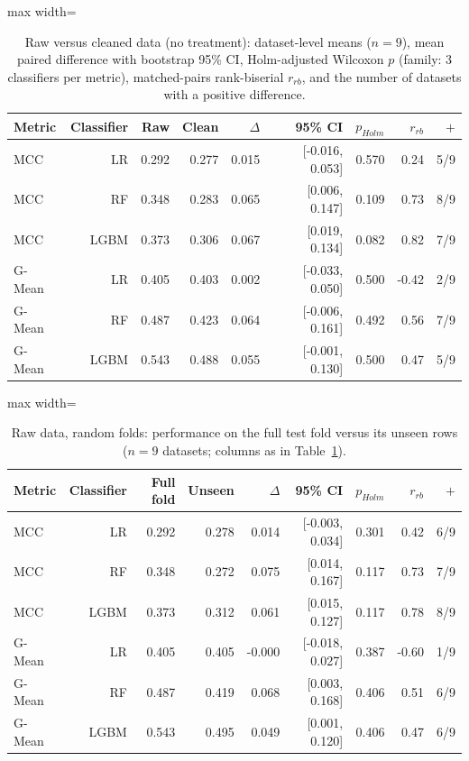 \begin{table}[t]
\centering
\footnotesize
\caption{Raw versus cleaned data (no treatment): dataset-level means ($n=9$), mean paired difference with bootstrap 95\% CI, Holm-adjusted Wilcoxon $p$ (family: 3 classifiers per metric), matched-pairs rank-biserial $r_{rb}$, and the number of datasets with a positive difference.}
\label{tab:rawclean}
\begin{adjustbox}{max width=\linewidth}
\begin{tabular}{lrrrrrrrr}
\toprule
Metric & Classifier & Raw & Clean & $\Delta$ & 95\% CI & $p_{Holm}$ & $r_{rb}$ & $+$ \\
\midrule
MCC & LR & 0.292 & 0.277 & 0.015 & [-0.016, 0.053] & 0.570 & 0.24 & 5/9 \\
MCC & RF & 0.348 & 0.283 & 0.065 & [0.006, 0.147] & 0.109 & 0.73 & 8/9 \\
MCC & LGBM & 0.373 & 0.306 & 0.067 & [0.019, 0.134] & 0.082 & 0.82 & 7/9 \\
G-Mean & LR & 0.405 & 0.403 & 0.002 & [-0.033, 0.050] & 0.500 & -0.42 & 2/9 \\
G-Mean & RF & 0.487 & 0.423 & 0.064 & [-0.006, 0.161] & 0.492 & 0.56 & 7/9 \\
G-Mean & LGBM & 0.543 & 0.488 & 0.055 & [-0.001, 0.130] & 0.500 & 0.47 & 5/9 \\
\bottomrule
\end{tabular}
\end{adjustbox}
\end{table}

\begin{table}[t]
\centering
\footnotesize
\caption{Raw data, random folds: performance on the full test fold versus its unseen rows ($n=9$ datasets; columns as in Table~\ref{tab:rawclean}).}
\label{tab:unseen}
\begin{adjustbox}{max width=\linewidth}
\begin{tabular}{lrrrrrrrr}
\toprule
Metric & Classifier & Full fold & Unseen & $\Delta$ & 95\% CI & $p_{Holm}$ & $r_{rb}$ & $+$ \\
\midrule
MCC & LR & 0.292 & 0.278 & 0.014 & [-0.003, 0.034] & 0.301 & 0.42 & 6/9 \\
MCC & RF & 0.348 & 0.272 & 0.075 & [0.014, 0.167] & 0.117 & 0.73 & 7/9 \\
MCC & LGBM & 0.373 & 0.312 & 0.061 & [0.015, 0.127] & 0.117 & 0.78 & 8/9 \\
G-Mean & LR & 0.405 & 0.405 & -0.000 & [-0.018, 0.027] & 0.387 & -0.60 & 1/9 \\
G-Mean & RF & 0.487 & 0.419 & 0.068 & [0.003, 0.168] & 0.406 & 0.51 & 6/9 \\
G-Mean & LGBM & 0.543 & 0.495 & 0.049 & [0.001, 0.120] & 0.406 & 0.47 & 6/9 \\
\bottomrule
\end{tabular}
\end{adjustbox}
\end{table}

